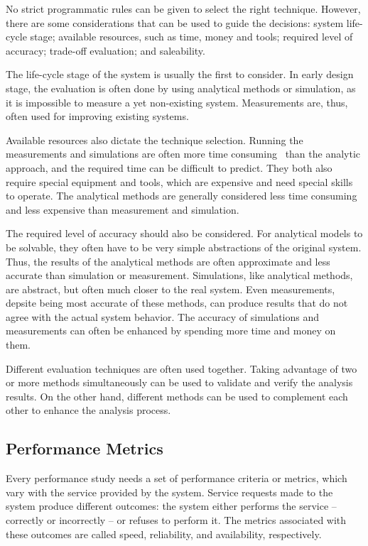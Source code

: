 No strict programmatic rules can be given to select the right technique. However, there are some considerations that can be used to guide the decisions: system life-cycle stage; available resources, such as time, money and tools; required level of accuracy; trade-off evaluation; and saleability.~\cite{jain:1991:AOCSPA}

The life-cycle stage of the system is usually the first to consider. In early design stage, the evaluation is often done by using analytical methods or simulation, as it is impossible to measure a yet non-existing system. Measurements are, thus, often used for improving existing systems.~\cite{jain:1991:AOCSPA}

Available resources also dictate the technique selection. Running the measurements and simulations are often more time consuming~\cite{Fujimoto:1990:PDE} than the analytic approach, and the required time can be difficult to predict. They both also require special equipment and tools, which are expensive and need special skills to operate. The analytical methods are generally considered less time consuming and less expensive than measurement and simulation.~\cite{jain:1991:AOCSPA}


The required level of accuracy should also be considered. For analytical models to be solvable, they often have to be very simple abstractions of the original system. Thus, the results of the analytical methods are often approximate and less accurate than simulation or measurement. Simulations, like analytical methods, are abstract, but often much closer to the real system. Even measurements, depsite being most accurate of these methods, can produce results that do not agree with the actual system behavior. The accuracy of simulations and measurements can often be enhanced by spending more time and money on them.~\cite{jain:1991:AOCSPA}

Different evaluation techniques are often used together. Taking advantage of two or more methods simultaneously can be used to validate and verify the analysis results. On the other hand, different methods can be used to complement each other to enhance the analysis process.~\cite{jain:1991:AOCSPA}


\subsection{Performance Metrics}
Every performance study needs a set of performance criteria or metrics, which vary with the service provided by the system. Service requests made to the system produce different outcomes: the system either performs the service -- correctly or incorrectly -- or refuses to perform it. The metrics associated with these outcomes are called speed, reliability, and availability, respectively.~\cite{jain:1991:AOCSPA}

